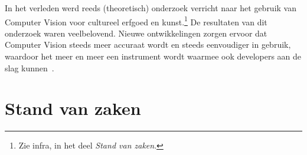 In het verleden werd reeds (theoretisch) onderzoek verricht naar het gebruik van Computer Vision voor cultureel erfgoed en kunst.\footnote{Zie infra, in het deel \emph{Stand van zaken}.} De resultaten van dit onderzoek waren veelbelovend. Nieuwe ontwikkelingen zorgen ervoor dat Computer Vision steeds meer accuraat wordt en steeds eenvoudiger in gebruik, waardoor het meer en meer een instrument wordt waarmee ook developers aan de slag kunnen~\autocite{Hindle2017}.


\section{Stand van zaken}
\label{sec:voorstel-state-of-the-art}

